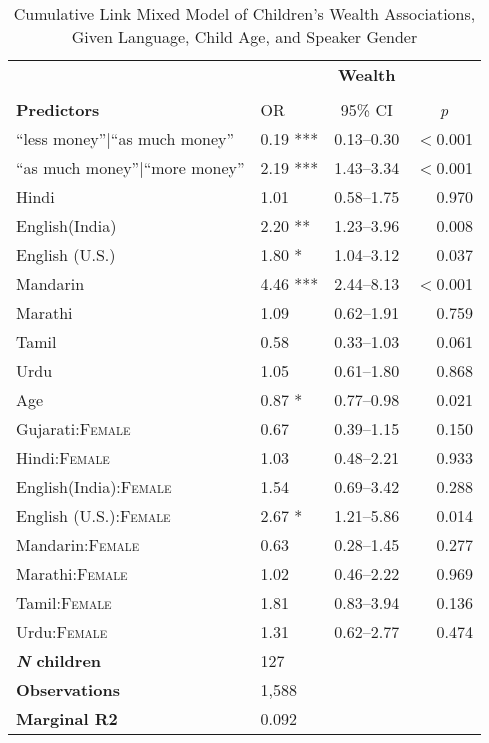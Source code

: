 \begin{table*}[t]
\small
\caption{Cumulative Link Mixed Model of Children's Wealth Associations, Given Language, Child Age, and Speaker Gender}\label{tab:wealth-gender-ord}
    \centering
    \vspace{5pt}
\begin{threeparttable}
\begin{tabular}{llcr}
 \toprule
& \multicolumn{3}{c}{\textbf{Wealth}\tnote{a}} \\
\cline{2-4} \\[-.75em]
\textbf{Predictors} & {OR} & {95\% CI} & \multicolumn{1}{c}{\textit{p}} \\ 
\midrule
``less money''$|$``as much money'' & 0.19 *** & 0.13--0.30 & $<$0.001 \\ 
  ``as much money''$|$``more money'' & 2.19 *** & 1.43--3.34 & $<$0.001 \\ 
  Hindi & 1.01 & 0.58--1.75 & 0.970 \\ 
  English(India) & 2.20 ** & 1.23--3.96 & 0.008 \\ 
  English (U.S.) & 1.80 * & 1.04--3.12 & 0.037 \\
  Mandarin & 4.46 *** & 2.44--8.13 & $<$0.001 \\ 
  Marathi & 1.09 & 0.62--1.91 & 0.759 \\ 
  Tamil & 0.58 & 0.33--1.03 & 0.061 \\ 
  Urdu & 1.05 & 0.61--1.80 & 0.868 \\ 
  Age\tnote{b} & 0.87 * & 0.77--0.98 & 0.021 \\ 
  Gujarati:\textsc{Female} & 0.67 & 0.39--1.15 & 0.150 \\ 
  Hindi:\textsc{Female} & 1.03 & 0.48--2.21 & 0.933 \\ 
  English(India):\textsc{Female} & 1.54 & 0.69--3.42 & 0.288 \\ 
  English (U.S.):\textsc{Female} & 2.67 * & 1.21--5.86 & 0.014 \\
  Mandarin:\textsc{Female} & 0.63 & 0.28--1.45 & 0.277 \\ 
  Marathi:\textsc{Female} & 1.02 & 0.46--2.22 & 0.969 \\ 
  Tamil:\textsc{Female} & 1.81 & 0.83--3.94 & 0.136 \\ 
  Urdu:\textsc{Female} & 1.31 & 0.62--2.77 & 0.474 \\ 
\midrule
\bfseries{\textit{N} children}\tnote{c} & 127 & & \\ 
\textbf{Observations}\tnote{d} & 1,588 & &\\ 
 \textbf{Marginal R2} &  0.092 &&\\

\end{tabular}
\end{threeparttable}
\end{table*}
